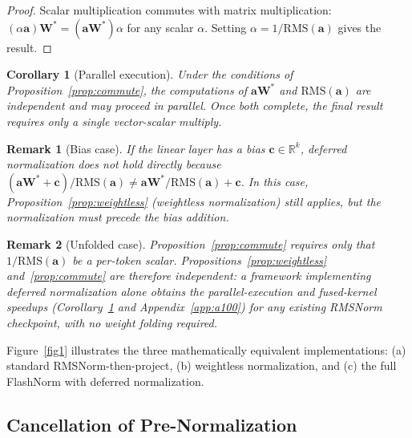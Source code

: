 \documentclass{article}
\newtheorem{corollary}{Corollary}
\newtheorem{remark}{Remark}
\begin{document}
\begin{proof}
Scalar multiplication commutes with matrix multiplication:
$(\alpha \mathbf{a})\mathbf{W}^* = (\mathbf{a}\mathbf{W}^*) \alpha$ for any scalar
$\alpha$. Setting $\alpha = 1/\mathrm{RMS}(\mathbf{a})$ gives the result.
\end{proof}

\begin{corollary}[Parallel execution]\label{cor:parallel}
Under the conditions of Proposition~\ref{prop:commute}, the computations of
$\mathbf{a}\mathbf{W}^*$ and $\mathrm{RMS}(\mathbf{a})$ are \emph{independent}
and may proceed in parallel. Once both complete, the final result requires only a single
vector-scalar multiply.
\end{corollary}

\begin{remark}[Bias case]
If the linear layer has a bias $\mathbf{c} \in \mathbb{R}^k$, deferred normalization
does not hold directly because
$(\mathbf{a}\mathbf{W}^* + \mathbf{c}) / \mathrm{RMS}(\mathbf{a}) \neq
 \mathbf{a}\mathbf{W}^*/\mathrm{RMS}(\mathbf{a}) + \mathbf{c}$.
In this case, Proposition~\ref{prop:weightless} (weightless normalization) still
applies, but the normalization must precede the bias addition.
\end{remark}

\begin{remark}[Unfolded case]
Proposition~\ref{prop:commute} requires only that $1/\mathrm{RMS}(\mathbf{a})$ be a per-token scalar. Propositions~\ref{prop:weightless} and~\ref{prop:commute} are therefore independent: a framework implementing deferred normalization alone obtains the parallel-execution and fused-kernel speedups (Corollary~\ref{cor:parallel} and Appendix~\ref{app:a100}) for any existing RMSNorm checkpoint, with no weight folding required.
\end{remark}

Figure~\ref{fig1} illustrates the three mathematically equivalent
implementations: (a) standard RMSNorm-then-project, (b) weightless normalization,
and (c) the full FlashNorm with deferred normalization.

\subsection{Cancellation of Pre-Normalization}\label{sec:rms-cancel}
\end{document}
